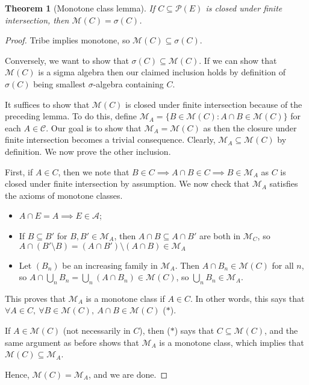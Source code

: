 \documentclass{article}
\theoremstyle{definition}
\theoremstyle{remark}
\theoremstyle{plain}
\newtheorem{thm}[defn]{Theorem}
\begin{document}
\begin{thm}[Monotone class lemma]
    If $C\subseteq\mathcal{P}(E)$ is closed under finite intersection, then $\mathcal{M}(C)=\sigma(C)$.
\end{thm}
\begin{proof}
    Tribe implies monotone, so $\mathcal{M}(C)\subseteq\sigma(C)$. 
    
    Conversely, we want to show that $\sigma(C)\subseteq \mathcal{M}(C)$. If we can show that $\mathcal{M}(C)$ is a sigma algebra then our claimed inclusion holds by definition of $\sigma(C)$ being smallest $\sigma$-algebra containing $C$.

    It suffices to show that $\mathcal{M}(C)$ is closed under finite intersection because of the preceding lemma. To do this, define $\mathcal{M}_A=\{B\in\mathcal{M}(C):A\cap B\in\mathcal{M}(C)\}$ for each $A\in\mathcal{C}$. Our goal is to show that $\mathcal{M}_A=\mathcal{M}(C)$ as then the closure under finite intersection becomes a trivial consequence. Clearly, $\mathcal{M}_A\subseteq \mathcal{M}(C)$ by definition. We now prove the other inclusion.
    
    First, if $A\in C$, then we note that $B\in C\implies A\cap B\in C\implies B\in\mathcal{M}_A$ as $C$ is closed under finite intersection by assumption. We now check that $\mathcal{M}_A$ satisfies the axioms of monotone classes.
    \begin{itemize}
        \item $A\cap E=A\implies E\in\mathcal{A}$;
        \item If $B\subseteq B'$ for $B,B'\in\mathcal{M}_A$, then $A\cap B\subseteq A\cap B'$ are both in $\mathcal{M}_C$, so $A\cap(B'\setminus B)=(A\cap B')\setminus(A\cap B)\in\mathcal{M}_A$
        \item Let $(B_n)$ be an increasing family in $\mathcal{M}_A$. Then $A\cap B_n\in\mathcal{M}(C)$ for all $n$, so $A\cap\bigcup_nB_n=\bigcup_n(A\cap B_n)\in\mathcal{M}(C)$, so $\bigcup_n B_n\in\mathcal{M}_A$.
    \end{itemize}
    This proves that $\mathcal{M}_A$ is a monotone class if $A\in C$. In other words, this says that $\forall A\in C ,\ \forall B\in\mathcal{M}(C),\ A\cap B\in\mathcal{M}(C)$ ($\ast$).

    If $A\in \mathcal{M}(C)$ (not necessarily in $C$), then ($\ast$) says that $C\subseteq\mathcal{M}(C)$, and the same argument as before shows that $\mathcal{M}_A$ is a monotone class, which implies that $\mathcal{M}(C)\subseteq\mathcal{M}_A$.

    Hence, $\mathcal{M}(C)=\mathcal{M}_A$, and we are done.
\end{proof}
\end{document}
